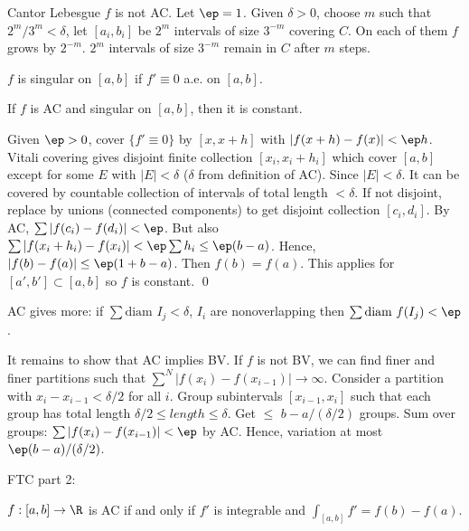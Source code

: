 \begin{ex}
Cantor Lebesgue $f$ is not AC. Let $\ep=1$. Given $\delta>0$, choose $m$ such that $2^m/3^m<\delta$, let $[a_i,b_i]$ be $2^m$ intervals of size $3^{-m}$ covering $C$. On each of them $f$ grows by $2^{-m}$. $2^m$ intervals of size $3^{-m}$ remain in $C$ after $m$ steps. 
\end{ex}


\begin{dfn}[Singular]
$f$ is singular on $[a,b]$ if $f' \equiv 0$ a.e. on $[a,b]$.
\end{dfn}


\begin{thm}
If $f$ is AC and singular on $[a,b]$, then it is constant.
\end{thm}

\pf Given $\ep>0$, cover $\{f'\equiv 0\}$ by $[x,x+h]$ with $|f(x+h)-f(x)|<\ep h$. Vitali covering gives disjoint finite collection $[x_i,x_i+h_i]$ which cover $[a,b]$ except for some $E$ with $|E|<\delta$ ($\delta$ from definition of AC). Since $|E|<\delta$. It can be covered by countable collection of intervals of total length $<\delta$. If not disjoint, replace by unions (connected components) to get disjoint collection $[c_i,d_i]$. By AC, $\sum |f(c_i) - f(d_i)| < \ep$. But also $\sum |f(x_i+h_i) - f(x_i)| < \ep \sum h_i \leq \ep(b-a)$. Hence, $|f(b)-f(a)| \leq \ep(1+b-a)$. Then $f(b)=f(a)$. This applies for $[a',b'] \subset [a,b]$ so $f$ is constant. \qed \\



\begin{rem}
AC gives more: if $\sum \text{diam }I_j < \delta$, $I_i$ are nonoverlapping then $\sum \text{diam } f(I_j) < \ep$. 
\end{rem}



It remains to show that AC implies BV. If $f$ is not BV, we can find finer and finer partitions such that $\sum^N |f(x_i)-f(x_{i-1})| \to \infty$. Consider a partition with $x_i - x_{i-1}< \delta/2$ for all $i$. Group subintervals $[x_{i-1},x_i]$ such that each group has total length $\delta/2 \leq length \leq \delta$. Get $\leq$ $b-a/(\delta/2)$ groups. Sum over groups: $\sum |f(x_i)-f(x_{i-1})| < \ep$ by AC. Hence, variation at most $\ep (b-a)/(\delta/2)$. 




FTC part 2:

$f: [a,b] \to \R$ is AC if and only if $f'$ is integrable and $\int_{[a,b]} f'= f(b)-f(a)$. 

